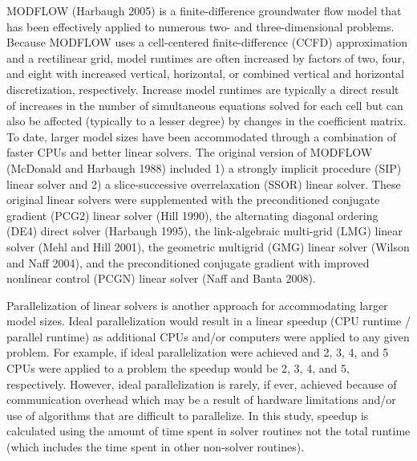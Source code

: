 \documentclass[12pt]{article}
\begin{document}
MODFLOW (Harbaugh 2005) is a finite-difference groundwater flow model that has been effectively applied to \color{blue}numerous \color{black}two- and three-dimensional problems. Because MODFLOW uses a cell-centered finite-difference (CCFD) approximation and a rectilinear grid, model runtimes are often increased by factors of two, four, and eight with increased vertical, horizontal, or combined vertical and horizontal discretization, respectively. \color{blue}Increase model runtimes are typically a direct result of increases in the number of simultaneous equations solved for each cell but can also be affected (typically to a lesser degree) by changes in the coefficient matrix. \color{black}To date, larger model sizes have been accommodated through a combination of faster CPUs and better linear solvers. The original version of MODFLOW (McDonald and Harbaugh 1988) included 1) a strongly implicit procedure (SIP) linear solver and 2) a slice-successive overrelaxation (\color{cyan}SSOR\color{black}) linear solver. These original linear solvers were supplemented with the preconditioned conjugate gradient (PCG2) linear solver (Hill 1990), \color{cyan}the alternating diagonal ordering (DE4) direct solver (Harbaugh 1995), \color{black}the link-algebraic multi-grid (LMG) linear solver (Mehl and Hill 2001), the geometric multigrid (GMG) linear solver (Wilson and Naff 2004), and the  preconditioned conjugate gradient with improved nonlinear control (PCGN) linear solver (Naff and Banta 2008).

Parallelization of linear solvers is another approach for accommodating larger model sizes. \color{blue}Ideal parallelization would result in a linear speedup  (CPU runtime / parallel runtime) as additional CPUs and/or computers were applied to any given problem. For example, if ideal parallelization were achieved and 2, 3, 4, and 5 CPUs were applied to a problem the speedup would be 2, 3, 4, and 5, respectively. However, ideal parallelization is rarely, if ever, achieved because of communication overhead which may be a result of hardware limitations and/or use of algorithms that are difficult to parallelize. \color{cyan}In this study, speedup is calculated using the amount of time spent in solver routines not the total runtime (which includes the time spent in other non-solver routines).\color{black}
\end{document}
